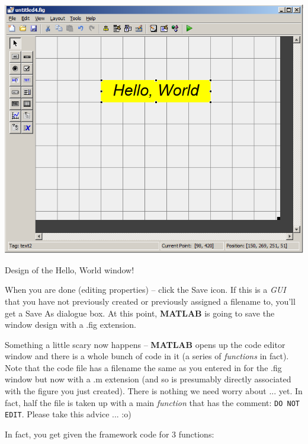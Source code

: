 \documentclass{tufte-book} %
\begin{document}
\begin{marginfigure}[-0.0in]
\includegraphics[width=\linewidth]{chGUI-HelloWorld.png}
\caption{Design of the Hello, World window!}
\label{fig:chGUI-HelloWorld}
\end{marginfigure}

When you are done (editing properties) -- click the \textsf{Save} icon. If this is a \textit{GUI} that you have not previously created or previously assigned a filename to, you'll get a \textsf{Save As} dialogue box. At this point, \textbf{MATLAB} is going to save the window design with a \textsf{.fig} extension.

Something a little scary now happens -- \textbf{MATLAB} opens up the \textsf{code editor window} and there is a whole bunch of code in it (a series of \textit{functions} in fact). Note that the code file has a filename the same as you entered in for the \textsf{.fig} window but now with a \textsf{.m} extension (and so is presumably directly associated with the figure you just created). There is nothing we need worry about ... yet. In fact, half the file is taken up with a main \textit{function} that has the comment: \texttt{DO NOT EDIT}. Please take this advice ... :o)

In fact, you get given the framework code for 3 functions:
\end{document}
